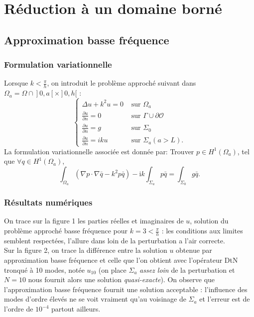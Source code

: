 \documentclass{article}
\begin{document}
\section{Réduction à un domaine borné}
\subsection{Approximation basse fréquence}
\subsubsection{Formulation variationnelle}
Lorsque $ k < \frac{\pi}{h}$, on introduit le problème approché suivant dans $\left.\Omega_a=\Omega \cap\right] 0, a[\times] 0, h[$ :
$$
\begin{cases}\displaystyle \Delta u+k^2 u=0 & \text { sur } \Omega_a \\[0.2cm] \displaystyle  \frac{\partial u}{\partial n}=0 & \text { sur } \Gamma \cup \partial \mathcal{O} \\[0.4cm] \displaystyle \frac{\partial u}{\partial n}=g & \text { sur } \Sigma_0 \\[0.4cm] \displaystyle  \frac{\partial u}{\partial n}=i k u & \text { sur } \Sigma_a(a>L) .\end{cases}
$$
La formulation variationnelle associée est donnée par: \bigbreak
Trouver $p \in H^1\left(\Omega_a\right)$, tel que $\forall q \in H^1\left(\Omega_a\right)$,
$$
\int_{\Omega_a}\left(\nabla p \cdot \nabla \bar{q}-k^2 p \bar{q}\right)-\mathrm{i} k \int_{\Sigma_a} p \bar{q}=\int_{\Sigma_{0}} g \bar{q} .
$$ 
\subsubsection{Résultats numériques}

On trace sur la figure 1 les parties réelles et imaginaires de $u$, solution du problème approché basse fréquence pour $ k = 3 < \frac{\pi}{h}$ : les conditions aux limites semblent respectées, l'allure dans loin de la perturbation a l'air correcte. \\
Sur la figure 2, on trace la différence entre la solution $u$ obtenue par approximation basse fréquence et celle que l'on obtient avec l'opérateur DtN tronqué à 10 modes, notée $u_{10}$ (on place $\Sigma_a$ \textit{assez loin} de la perturbation et $N=10$ nous fournit alors une solution \textit{quasi-exacte}). On observe que l'approximation basse fréquence fournit une solution acceptable : l'influence des modes d'ordre élevés ne se voit vraiment qu'au voisinage de $\Sigma_a$ et l'erreur est de l'ordre de $10^{-4}$ partout ailleurs.
\end{document}
